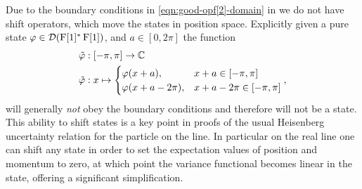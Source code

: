 Due to the boundary conditions in \eqref{eqn:good-opf[2]-domain} in we do not have shift operators, which move the states in position space. Explicitly given a pure state $\varphi\in\mathcal{D}(\operatorname{F}[1]^*\operatorname{F}[1])$, and $a\in [0,2\pi] $ the function
\begin{align}
  \tilde{\varphi}&:[-\pi,\pi]\to \mathbb{C}\\
  \tilde{\varphi}&:x\mapsto \begin{cases}\varphi(x+a), & x+a\in [-\pi,\pi]\\ \varphi(x+a-2\pi), & x+a-2\pi\in [-\pi,\pi]\end{cases},
\end{align}
will generally \emph{not} obey the boundary conditions and therefore will not be a state. This ability to shift states is a key point in proofs of the usual Heisenberg uncertainty relation for the particle on the line. In particular on the real line one can shift any state in order to set the expectation values of position and momentum to zero, at which point the variance functional becomes linear in the state, offering a significant simplification.

